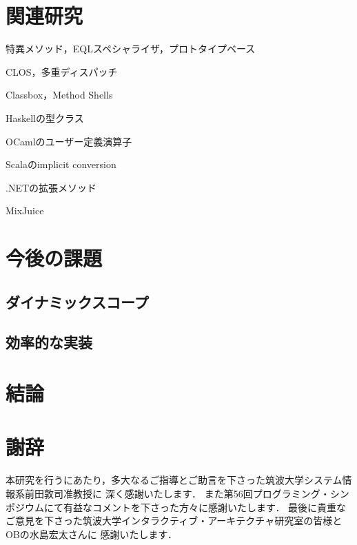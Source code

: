 \documentclass[a4paper,11pt,dvipdfmx]{jreport}
\makeatletter
\renewenvironment{thebibliography}[1]%
{\chapter*{\bibname\@mkboth{\bibname}{\bibname}}%
	\addcontentsline{toc}{chapter}{\numberline{}\bibname}%
	\list{\@biblabel{\@arabic\c@enumiv}}%
	{\settowidth\labelwidth{\@biblabel{#1}}%
		\leftmargin\labelwidth
		\advance\leftmargin\labelsep
		\@openbib@code
		\usecounter{enumiv}%
		\let\p@enumiv\@empty
		\renewcommand\theenumiv{\@arabic\c@enumiv}}%
	\sloppy
	\clubpenalty4000
	\@clubpenalty\clubpenalty
	\widowpenalty4000%
	\sfcode`\.\@m}
{\def\@noitemerr
	{\@latex@warning{Empty `thebibliography' environment}}%
	\endlist}
\makeatother
\begin{document}
\chapter{関連研究}
\label{chapter:related-work}

特異メソッド，EQLスペシャライザ，プロトタイプベース

CLOS，多重ディスパッチ

Classbox，Method Shells

Haskellの型クラス

OCamlのユーザー定義演算子

Scalaのimplicit conversion

.NETの拡張メソッド

MixJuice


\chapter{今後の課題}
\label{chapter:future-work}

\section{ダイナミックスコープ}

\section{効率的な実装}


\chapter{結論}
\label{chapter:conclusion}


\chapter*{謝辞}

本研究を行うにあたり，多大なるご指導とご助言を下さった筑波大学システム情報系前田敦司准教授に
深く感謝いたします．
また第56回プログラミング・シンポジウムにて有益なコメントを下さった方々に感謝いたします．
最後に貴重なご意見を下さった筑波大学インタラクティブ・アーキテクチャ研究室の皆様とOBの水島宏太さんに
感謝いたします．

\newpage

\renewcommand{\bibname}{参考文献}




%
%
\end{document}
